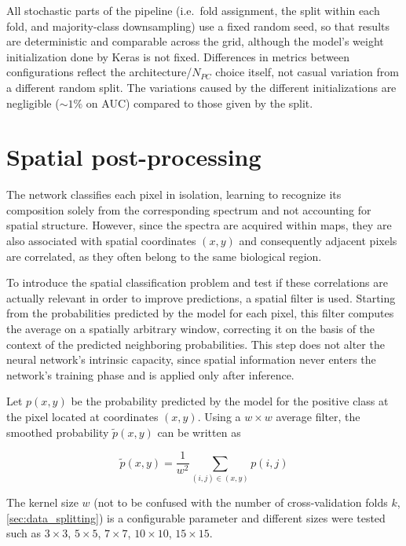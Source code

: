 All stochastic parts of the pipeline (i.e.\ fold assignment, the split within each fold, and majority-class downsampling) use a fixed random seed, so that results are deterministic and comparable across the grid, although the model's weight initialization done by Keras is not fixed. Differences in metrics between configurations reflect the architecture/$N_{PC}$ choice itself, not casual variation from a different random split. The variations caused by the different initializations are negligible ($\sim1\%$ on AUC) compared to those given by the split.



\section{Spatial post-processing}
\label{sec:spatial_post_processing}

The network classifies each pixel in isolation, learning to recognize its composition solely from the corresponding spectrum and not accounting for spatial structure. However, since the spectra are acquired within maps, they are also associated with spatial coordinates \((x,y)\) and consequently adjacent pixels are correlated, as they often belong to the same biological region.

To introduce the spatial classification problem and test if these correlations are actually relevant in order to improve predictions, a spatial filter is used. Starting from the probabilities predicted by the model for each pixel, this filter computes the average on a spatially arbitrary window, correcting it on the basis of the context of the predicted neighboring probabilities.
This step does not alter the neural network's intrinsic capacity, since spatial information never enters the network's training phase and is applied only after inference.

Let \(p(x,y)\) be the probability predicted by the model for the positive class at the pixel located at coordinates \((x,y)\). Using a \(w \times w\) average filter, the smoothed probability \(\tilde{p}(x,y)\) can be written as

\begin{equation}
    \tilde{p}(x,y) =
    \frac{1}{w^2}
    \sum_{(i,j)\in(x,y)} p(i,j)
    \label{eq:spatial_smoothing}
\end{equation}

The kernel size $w$ (not to be confused with the number of cross-validation folds $k$, \cref{sec:data_splitting}) is a configurable parameter and different sizes were tested such as \(3 \times 3\), \(5 \times 5\), \(7 \times 7\), \(10 \times 10\), \(15 \times 15\).


